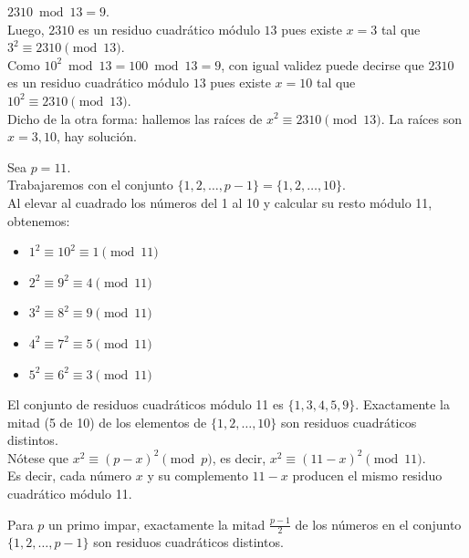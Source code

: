 \begin{ejemplo}
$2310 \bmod 13 = 9$. \\
Luego, $2310$ es un residuo cuadrático módulo $13$ pues existe $x=3$ tal que $3^2  \equiv 2310 \pmod {13}$. \\
Como $10^2 \bmod 13 = 100 \bmod 13 = 9$, con igual validez puede decirse que $2310$ es un residuo cuadrático módulo $13$ pues existe $x=10$ tal que $10^2  \equiv 2310 \pmod {13}$. \\
Dicho de la otra forma: hallemos las raíces de $x^2  \equiv 2310 \pmod {13}$. La raíces son $x=3,10$, hay solución.
\end{ejemplo}

\begin{ejemplo} Sea $p=11$. \\
Trabajaremos con el conjunto $\{1, 2, \dots, p-1\} = \{1, 2, \dots, 10\}$. \\
Al elevar al cuadrado los números del 1 al 10 y calcular su resto módulo 11, obtenemos:
\begin{itemize}
    \item $1^2 \equiv 10^2 \equiv 1 \pmod{11}$
    \item $2^2 \equiv 9^2 \equiv 4 \pmod{11}$
    \item $3^2 \equiv 8^2 \equiv 9 \pmod{11}$
    \item $4^2 \equiv 7^2 \equiv 5 \pmod{11}$
    \item $5^2 \equiv 6^2 \equiv 3 \pmod{11}$
\end{itemize}
El conjunto de residuos cuadráticos módulo 11 es $\{1, 3, 4, 5, 9\}$. 
Exactamente la mitad (5 de 10) de los elementos de $\{1, 2, \dots, 10\}$ son residuos cuadráticos distintos. \\
Nótese que $x^2 \equiv (p-x)^2 \pmod{p}$, es decir, $x^2 \equiv (11-x)^2 \pmod{11}$. \\
Es decir, cada número $x$ y su complemento $11-x$ producen el mismo residuo cuadrático módulo 11.
\end{ejemplo}

\begin{enunciado} \label{enun:numResiduos}\leavevmode\par
Para $p$ un primo impar, exactamente la mitad $\frac{p-1}{2}$ de los números en el conjunto $\{1, 2, \dots, p-1\}$ son residuos cuadráticos distintos.
\end{enunciado}

